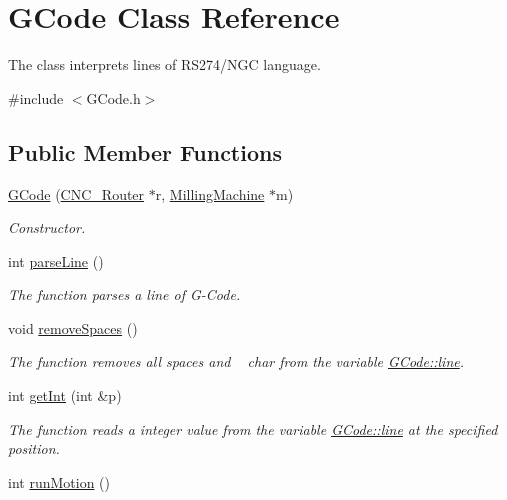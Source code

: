 \hypertarget{class_g_code}{\section{G\+Code Class Reference}
\label{class_g_code}
}


The class interprets lines of R\+S274/\+N\+G\+C language.  




{\ttfamily \#include $<$G\+Code.\+h$>$}

\subsection*{Public Member Functions}
\begin{DoxyCompactItemize}
\item 
\hyperlink{class_g_code_aacf3133ce2c42e9844be2ac10516846a}{G\+Code} (\hyperlink{class_c_n_c___router}{C\+N\+C\+\_\+\+Router} $\ast$r, \hyperlink{class_milling_machine}{Milling\+Machine} $\ast$m)
\begin{DoxyCompactList}\small\item\em Constructor. \end{DoxyCompactList}\item 
int \hyperlink{class_g_code_a1785db665332977787a38b6b2563b395}{parse\+Line} ()
\begin{DoxyCompactList}\small\item\em The function parses a line of G-\/\+Code. \end{DoxyCompactList}\item 
void \hyperlink{class_g_code_a3912e1dad7257e2336ab09c55ff17235}{remove\+Spaces} ()
\begin{DoxyCompactList}\small\item\em The function removes all spaces and  ~\newline
 char from the variable \hyperlink{class_g_code_a20d7c90740e9e139b24f68336ad8c8f1}{G\+Code\+::line}. \end{DoxyCompactList}\item 
int \hyperlink{class_g_code_a71e259cc07dc7c1473d58cb70faa3630}{get\+Int} (int \&p)
\begin{DoxyCompactList}\small\item\em The function reads a integer value from the variable \hyperlink{class_g_code_a20d7c90740e9e139b24f68336ad8c8f1}{G\+Code\+::line} at the specified position. \end{DoxyCompactList}\item 
int \hyperlink{class_g_code_ad30dc86177f9e5749daa91d8727f364e}{run\+Motion} ()

\end{DoxyCompactItemize}
